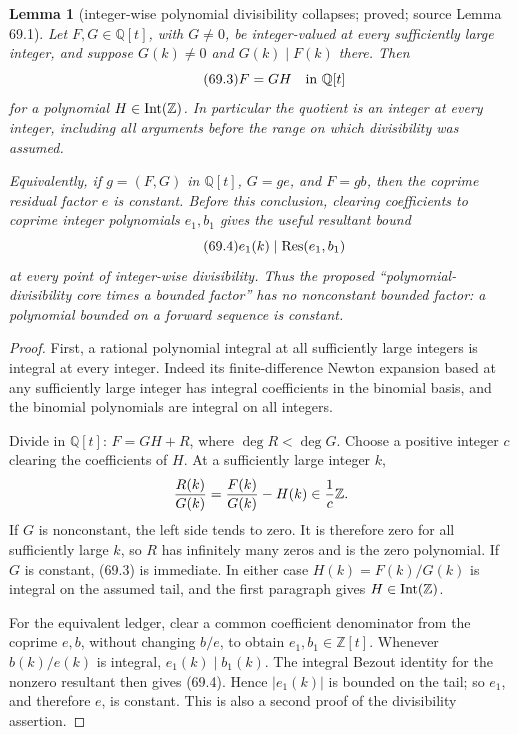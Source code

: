 \documentclass[10pt,reqno]{amsart}
\newtheorem{lemma}[theorem]{Lemma}
\theoremstyle{definition}
\newcommand{\1}{\mathbf 1}
\begin{document}
\begin{lemma}[integer-wise polynomial divisibility collapses; proved; source Lemma 69.1]
\label{lem:integerwise-collapse}
Let $F,G\in\mathbb Q[t]$, with $G\ne0$, be integer-valued at every
sufficiently large integer, and suppose $G(k)\ne0$ and $G(k)\mid F(k)$
there.  Then
\begin{equation}\tag{69.3}
                         F=GH\quad\hbox{in }\mathbb Q[t]
\end{equation}
for a polynomial $H\in{\rm Int}(\mathbb Z)$.  In particular the quotient is
an integer at every integer, including all arguments before the range on
which divisibility was assumed.

Equivalently, if $g=(F,G)$ in $\mathbb Q[t]$, $G=ge$, and $F=gb$, then the
coprime residual factor $e$ is constant.  Before this conclusion, clearing
coefficients to coprime integer polynomials $e_1,b_1$ gives the useful
resultant bound
\begin{equation}\tag{69.4}
 e_1(k)\mid {\rm Res}(e_1,b_1)
\end{equation}
at every point of integer-wise divisibility.  Thus the proposed
``polynomial-divisibility core times a bounded factor'' has no nonconstant
bounded factor: a polynomial bounded on a forward sequence is constant.
\end{lemma}
\begin{proof}
First, a rational polynomial integral at all sufficiently large integers is
integral at every integer.  Indeed its finite-difference Newton expansion
based at any sufficiently large integer has integral coefficients in the
binomial basis, and the binomial polynomials are integral on all integers.

Divide in $\mathbb Q[t]$: $F=GH+R$, where $\deg R<\deg G$.  Choose a
positive integer $c$ clearing the coefficients of $H$.  At a sufficiently
large integer $k$,
\[
 {R(k)\over G(k)}={F(k)\over G(k)}-H(k)\in {1\over c}\mathbb Z.
\]
If $G$ is nonconstant, the left side tends to zero.  It is therefore zero
for all sufficiently large $k$, so $R$ has infinitely many zeros and is the
zero polynomial.  If $G$ is constant, (69.3) is immediate.  In either case
$H(k)=F(k)/G(k)$ is integral on the assumed tail, and the first paragraph
gives $H\in{\rm Int}(\mathbb Z)$.

For the equivalent ledger, clear a common coefficient denominator from the
coprime $e,b$, without changing $b/e$, to obtain
$e_1,b_1\in\mathbb Z[t]$.  Whenever $b(k)/e(k)$ is integral,
$e_1(k)\mid b_1(k)$.  The integral Bezout identity for the nonzero resultant
then gives (69.4).  Hence $|e_1(k)|$ is bounded on the tail; so $e_1$, and
therefore $e$, is constant.  This is also a second proof of the divisibility
assertion.
\end{proof}
\end{document}
